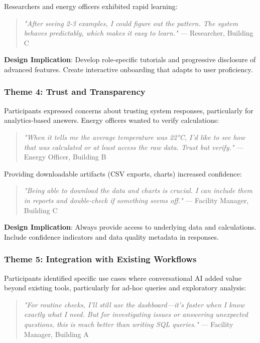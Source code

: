 \documentclass[acmlarge]{acmart}
\begin{document}
Researchers and energy officers exhibited rapid learning:

\begin{quote}
\textit{"After seeing 2-3 examples, I could figure out the pattern. The system behaves predictably, which makes it easy to learn."} — Researcher, Building C
\end{quote}

\textbf{Design Implication}: Develop role-specific tutorials and progressive disclosure of advanced features. Create interactive onboarding that adapts to user proficiency.

\subsubsection{Theme 4: Trust and Transparency}

Participants expressed concerns about trusting system responses, particularly for analytics-based answers. Energy officers wanted to verify calculations:

\begin{quote}
\textit{"When it tells me the average temperature was 22°C, I'd like to see how that was calculated or at least access the raw data. Trust but verify."} — Energy Officer, Building B
\end{quote}

Providing downloadable artifacts (CSV exports, charts) increased confidence:

\begin{quote}
\textit{"Being able to download the data and charts is crucial. I can include them in reports and double-check if something seems off."} — Facility Manager, Building C
\end{quote}

\textbf{Design Implication}: Always provide access to underlying data and calculations. Include confidence indicators and data quality metadata in responses.

\subsubsection{Theme 5: Integration with Existing Workflows}

Participants identified specific use cases where conversational AI added value beyond existing tools, particularly for ad-hoc queries and exploratory analysis:

\begin{quote}
\textit{"For routine checks, I'll still use the dashboard—it's faster when I know exactly what I need. But for investigating issues or answering unexpected questions, this is much better than writing SQL queries."} — Facility Manager, Building A
\end{quote}
\end{document}
